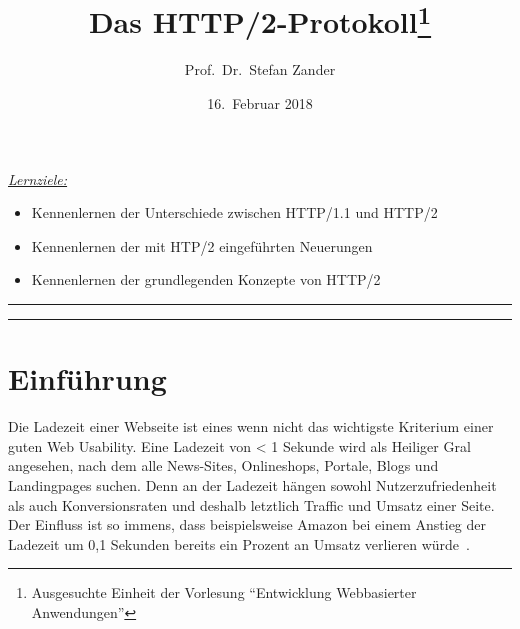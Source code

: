 \documentclass[a4paper, justified, notoc]{tufte-handout} %
\title{Das HTTP/2-Protokoll\thanks{Ausgesuchte Einheit der Vorlesung ``Entwicklung Webbasierter Anwendungen''}}
\author[opt Author]{Prof.\ Dr.\ Stefan Zander}
\date{16.\ Februar 2018}  %
\newenvironment{lernziele}{
	\begin{mdframed}[hidealllines=true,backgroundcolor=gray!20] 
	\small \itshape
	\noindent \underline{Lernziele:} 
	} 
	{ 
	\end{mdframed}
}
\begin{document}
\maketitle%


\begin{lernziele}
\begin{itemize}
	\item Kennenlernen der Unterschiede zwischen HTTP/1.1 und HTTP/2
	\item Kennenlernen der mit HTP/2 eingeführten Neuerungen 
	\item Kennenlernen der grundlegenden Konzepte von HTTP/2
\end{itemize}
\end{lernziele}


\setcounter{secnumdepth}{2} %

\noindent \rule{1.54\textwidth}{0.4pt}
\tableofcontents
\noindent \rule{1.54\textwidth}{0.4pt}

\section{Einführung}\label{sec:introduction}

Die Ladezeit einer Webseite ist eines wenn nicht das wichtigste Kriterium einer guten Web Usability. Eine Ladezeit von < 1 Sekunde wird als Heiliger Gral angesehen, nach dem alle News-Sites, Onlineshops, Portale, Blogs und Landingpages suchen. Denn an der Ladezeit hängen sowohl Nutzerzufriedenheit als auch Konversionsraten und deshalb letztlich Traffic und Umsatz einer Seite. Der Einfluss ist so immens, dass beispielsweise Amazon bei einem Anstieg der Ladezeit um 0,1 Sekunden bereits ein Prozent an Umsatz verlieren würde~\citep{heise:2018}.
\end{document}

